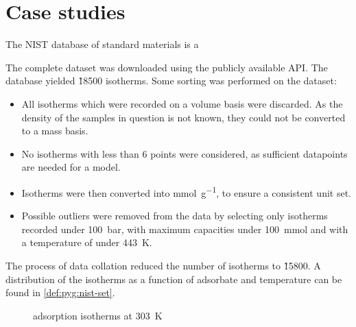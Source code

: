 
\section{Case studies}

The NIST database of standard materials is a 

The complete dataset was downloaded using the publicly available API. 
The database yielded \~18500 isotherms.
Some sorting was performed on the dataset:

\begin{itemize}
    \item All isotherms which were recorded on a volume 
    basis were discarded. As the density of the samples in
    question is not known, they could not be converted to 
    a mass basis. 
    \item No isotherms with less than 6 points were considered,
    as sufficient datapoints are needed for a model.
    \item Isotherms were then converted into \si{\milli\mol\per\gram},
    to ensure a consistent unit set.
    \item Possible outliers were removed from the data by selecting 
    only isotherms recorded under \SI{100}{\bar}, with maximum capacities
    under \SI{100}{\milli\mol} and with a temperature of under 
    \SI{443}{\kelvin}.
\end{itemize}

The process of data collation reduced the number of isotherms
to \~15800. A distribution of the isotherms as a function of adsorbate
and temperature can be found in \autoref{def:pyg:nist-set}.

\begin{figure}[htb]
    \centering


    \caption{ adsorption isotherms at \SI{303}{\kelvin}}%
    \label{def:pyg:nist-set}
\end{figure}